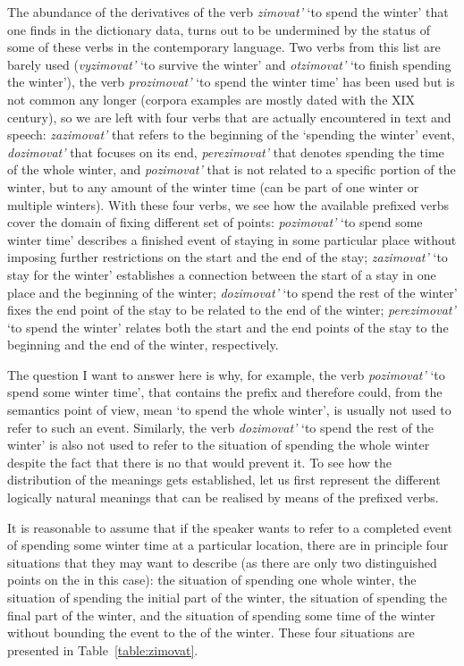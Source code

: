 The abundance of the derivatives of the verb \textit{zimovat'} `to spend the winter' that one finds in the dictionary data, turns out to be undermined by the status of some of these verbs in the contemporary language. Two verbs from this list are barely used (\textit{vyzimovat'} `to survive the winter' and \textit{otzimovat'} `to finish spending the winter'), the verb \textit{prozimovat'} `to spend the winter time' has been used but is not common any longer (corpora examples are mostly dated with the XIX century), so we are left with four verbs that are actually encountered in text and speech: \textit{zazimovat'} that refers to the beginning of the `spending the winter' event, \textit{dozimovat'} that focuses on its end, \textit{perezimovat'} that denotes spending the time of the whole winter, and \textit{pozimovat'} that is not related to a specific portion of the winter, but to any amount of the winter time (can be part of one winter or multiple winters). With these four verbs, we see how the available prefixed verbs cover the domain of fixing different set of points: \textit{pozimovat'} `to spend some winter time' describes a finished event of staying in some particular place without imposing further restrictions on the start and the end of the stay; \textit{zazimovat'} `to stay for the winter' establishes a connection between the start of a stay in one place and the beginning of the winter; \textit{dozimovat'} `to spend the rest of the winter' fixes the end point of the stay to be related to the end of the winter; \textit{perezimovat'} `to spend the winter' relates both the start and the end points of the stay to the beginning and the end of the winter, respectively.

The question I want to answer here is why, for example, the verb \textit{pozimovat'} `to spend some winter time', that contains the prefix  and therefore could, from the semantics point of view, mean `to spend the whole winter', is usually not used to refer to such an event. Similarly, the verb \textit{dozimovat'} `to spend the rest of the winter' is also not used to refer to the situation of spending the whole winter despite the fact that there is no  that would prevent it. To see how the distribution of the meanings gets established, let us first represent the different logically natural meanings that can be realised by means of the prefixed verbs. 

It is reasonable to assume that if the speaker wants to refer to a completed event of spending some winter time at a particular location, there are in principle four situations that they may want to describe (as there are only two distinguished points on the  in this case): the situation of spending one whole winter, the situation of spending the initial part of the winter, the situation of spending the final part of the winter, and the situation of spending some time of the winter without bounding the event  to the  of the winter. These four situations are presented in Table~\ref{table:zimovat}.

